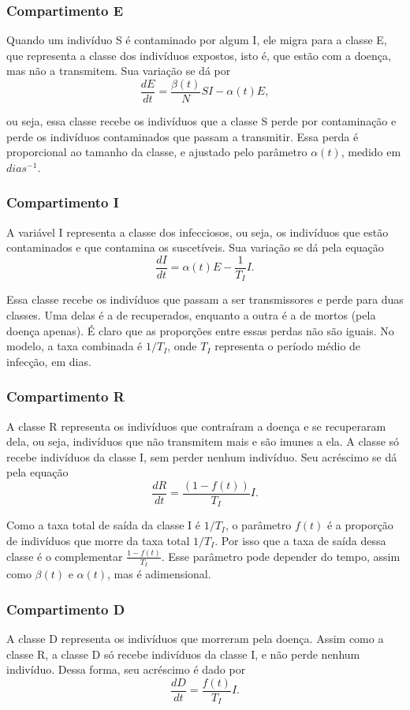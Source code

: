 \documentclass{article}
\begin{document}
\subsubsection{Compartimento E}
Quando um indivíduo S é contaminado por algum I, ele migra para a classe E, que representa a classe dos indivíduos expostos, isto é, que estão com a doença, mas não a transmitem. Sua variação se dá por
\[\dfrac{dE}{dt} = \dfrac{\beta(t)}{N}SI - \alpha(t) E,\]

\noindent ou seja, essa classe recebe os indivíduos que a classe S perde por contaminação e perde os indivíduos contaminados que passam a transmitir. Essa perda é proporcional ao tamanho da classe, e ajustado pelo parâmetro $\alpha(t)$, medido em $dias^{-1}$.

\subsubsection{Compartimento I}
A variável I representa a classe dos infecciosos, ou seja, os indivíduos que estão contaminados e que contamina os suscetíveis. Sua variação se dá pela equação
\[\dfrac{dI}{dt} = \alpha(t) E - \dfrac{1}{T_I}I.\]

Essa classe recebe os indivíduos que passam a ser transmissores e perde para duas classes. Uma delas é a de recuperados, enquanto a outra é a de mortos (pela doença apenas). É claro que as proporções entre essas perdas não são iguais. No modelo, a taxa combinada é $1/T_I$, onde $T_I$ representa o período médio de infecção, em dias.

\subsubsection{Compartimento R}
A classe R representa os indivíduos que contraíram a doença e se recuperaram dela, ou seja, indivíduos que não transmitem mais e são imunes a ela. A classe só recebe indivíduos da classe I, sem perder nenhum indivíduo. Seu acréscimo se dá pela equação
\[\dfrac{dR}{dt} = \dfrac{(1 - f(t))}{T_I}I.\]

Como a taxa total de saída da classe I é $1/T_I$, o parâmetro $f(t)$ é a proporção de indivíduos que morre da taxa total $1/T_I$. Por isso que a taxa de saída dessa classe é o complementar $\frac{1 - f(t)}{T_I}$. Esse parâmetro pode depender do tempo, assim como $\beta(t)$ e $\alpha(t)$, mas é adimensional.

\subsubsection{Compartimento D}
A classe D representa os indivíduos que morreram pela doença. Assim como a classe R, a classe D só recebe indivíduos da classe I, e não perde nenhum indivíduo. Dessa forma, seu acréscimo é dado por
\[\dfrac{dD}{dt} = \dfrac{f(t)}{T_I}I.\]
\end{document}
